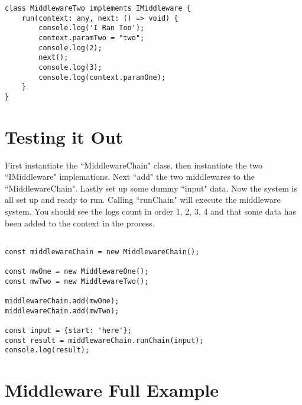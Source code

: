 \documentclass[12pt]{article}
\begin{document}
\begin{lstlisting}[caption=Full Script,label=code:mwtwo]
class MiddlewareTwo implements IMiddleware {
    run(context: any, next: () => void) {
        console.log('I Ran Too');
        context.paramTwo = "two";
        console.log(2);
        next();
        console.log(3);
        console.log(context.paramOne);
    }
}
\end{lstlisting}

\section{Testing it Out}

First instantiate the ``MiddlewareChain" class, then instantiate the two ``IMiddleware" implemations. Next ``add" the two middlewares to the ``MiddlewareChain". Lastly set up some dummy ``input" data. Now the system is all set up and ready to run. Calling ``runChain" will execute the middleware system. You should see the logs count in order 1, 2, 3, 4 and that some data has been added to the context in the process.

\begin{lstlisting}[caption=Full Script,label=code:demo]

const middlewareChain = new MiddlewareChain();

const mwOne = new MiddlewareOne();
const mwTwo = new MiddlewareTwo();

middlewareChain.add(mwOne);
middlewareChain.add(mwTwo);

const input = {start: 'here'};
const result = middlewareChain.runChain(input);
console.log(result);
\end{lstlisting}

\section{Middleware Full Example}
\end{document}
